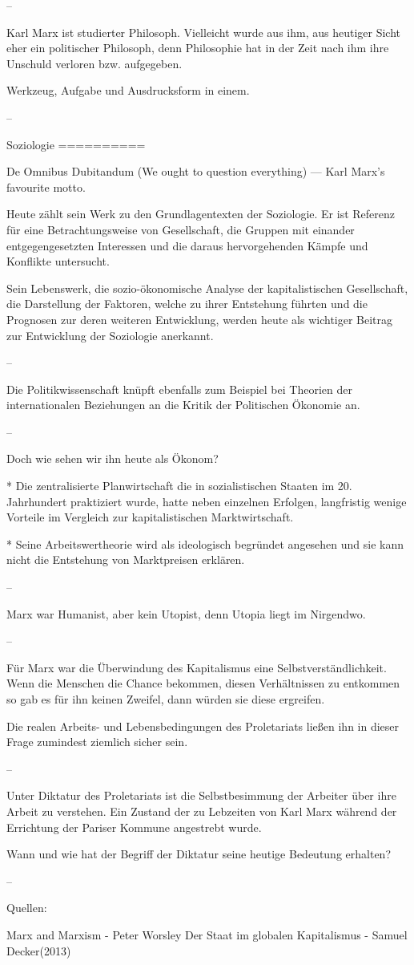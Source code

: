 --

Karl Marx ist studierter Philosoph. Vielleicht wurde aus ihm, aus 
heutiger Sicht eher ein politischer Philosoph, denn Philosophie
hat in der Zeit nach ihm ihre Unschuld verloren bzw. aufgegeben.

Werkzeug, Aufgabe und Ausdrucksform in einem.

--

Soziologie
==========

De Omnibus Dubitandum (We ought to question everything)
 — Karl Marx’s favourite motto.

Heute zählt sein Werk zu den Grundlagentexten der
Soziologie. Er ist Referenz für eine Betrachtungsweise
von Gesellschaft, die Gruppen mit einander entgegengesetzten
Interessen und die daraus hervorgehenden Kämpfe und Konflikte
untersucht.

Sein Lebenswerk, die sozio-ökonomische Analyse der kapitalistischen
Gesellschaft, die Darstellung der Faktoren, welche zu ihrer
Entstehung führten und die Prognosen zur deren weiteren Entwicklung,
werden heute als wichtiger Beitrag zur Entwicklung der Soziologie
anerkannt.

--

Die Politikwissenschaft knüpft ebenfalls zum Beispiel bei
Theorien der internationalen Beziehungen an die Kritik der
Politischen Ökonomie an. 

--

Doch wie sehen wir ihn heute als Ökonom?

  * Die zentralisierte Planwirtschaft die in sozialistischen
    Staaten im 20. Jahrhundert praktiziert wurde, hatte neben
    einzelnen Erfolgen, langfristig wenige Vorteile im Vergleich
    zur kapitalistischen Marktwirtschaft.

  * Seine Arbeitswertheorie wird als ideologisch begründet angesehen
    und sie kann nicht die Entstehung von Marktpreisen erklären.

-- 

Marx war Humanist, aber kein Utopist, denn Utopia liegt im Nirgendwo.

-- 

Für Marx war die Überwindung des Kapitalismus eine Selbstverständlichkeit.
Wenn die Menschen die Chance bekommen, diesen Verhältnissen zu entkommen
so gab es für ihn keinen Zweifel, dann würden sie diese ergreifen.

Die realen Arbeits- und Lebensbedingungen des Proletariats ließen ihn in
dieser Frage zumindest ziemlich sicher sein.

--

Unter Diktatur des Proletariats ist die Selbstbesimmung der Arbeiter
über ihre Arbeit zu verstehen. Ein Zustand der zu Lebzeiten von Karl
Marx während der Errichtung der Pariser Kommune angestrebt wurde. 

Wann und wie hat der Begriff der Diktatur seine heutige Bedeutung erhalten?

--

Quellen:

Marx and Marxism - Peter Worsley
Der Staat im globalen Kapitalismus - Samuel Decker(2013)
